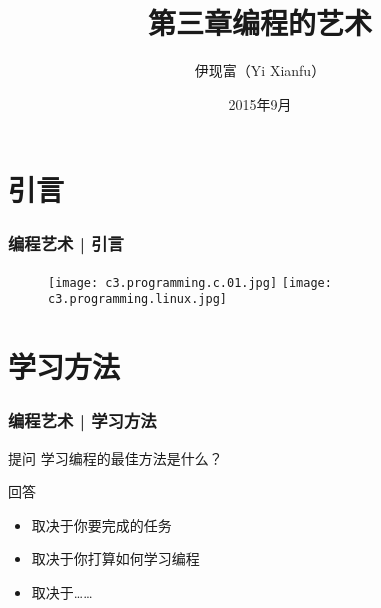 


\title[编程的艺术]{第三章\quad 编程的艺术}
\author[Yixf]{伊现富（Yi Xianfu）}
\date{2015年9月}



\section{引言}
\begin{frame}
  \frametitle{编程艺术 | 引言}
  \begin{figure}
    \centering
    \texttt{[image: c3.programming.c.01.jpg]}
    \quad
    \texttt{[image: c3.programming.linux.jpg]}
  \end{figure}
\end{frame}

\section{学习方法}
\begin{frame}
  \frametitle{编程艺术 | 学习方法}
  \begin{block}{提问}
 学习编程的最佳方法是什么？ 
  \end{block}
  \pause
  \begin{block}{回答}
    \begin{itemize}
      \item 取决于你要完成的任务
      \item 取决于你打算如何学习编程
      \item 取决于……
    \end{itemize}
  \end{block}
\end{frame}

